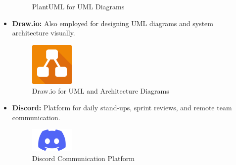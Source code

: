 \begin{itemize}
\begin{figure}[H]
        \caption{PlantUML for UML Diagrams}
        \label{fig:plantuml}
    \end{figure}
\item \textbf{Draw.io:} Also employed for designing UML diagrams and system architecture visually.
    \begin{figure}[H]
        \centering
        \includegraphics[width=0.2\textwidth]{chapters/chapter 1/figures/drawio.png}
        \caption{Draw.io for UML and Architecture Diagrams}
        \label{fig:drawio}
    \end{figure}
\item \textbf{Discord:} Platform for daily stand-ups, sprint reviews, and remote team communication.
    \begin{figure}[H]
        \centering
        \includegraphics[width=0.2\textwidth]{chapters/chapter 1/figures/Discord-Logo.png}
        \caption{Discord Communication Platform}
        \label{fig:discord}
    \end{figure}
\end{itemize}

